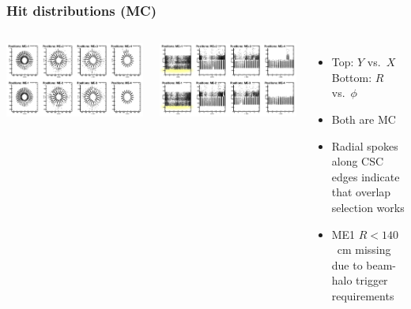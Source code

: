 \documentclass[compress]{beamer}
\begin{document}
\begin{frame}
\frametitle{Hit distributions (MC)}

\begin{columns}
\includegraphics[width=\linewidth]{MCBeamHalo_positions1.png}

\includegraphics[width=\linewidth]{MCBeamHalo_positions2.png}

\begin{itemize}
\item Top: $Y$ vs.\ $X$ \\ Bottom: $R$ vs.\ $\phi$

\item Both are MC

\item Radial spokes along CSC edges indicate that overlap selection works

\item ME1 $R < 140$~cm missing due to beam-halo
  trigger requirements
\end{itemize}


\end{columns}
\end{frame}
\end{document}
